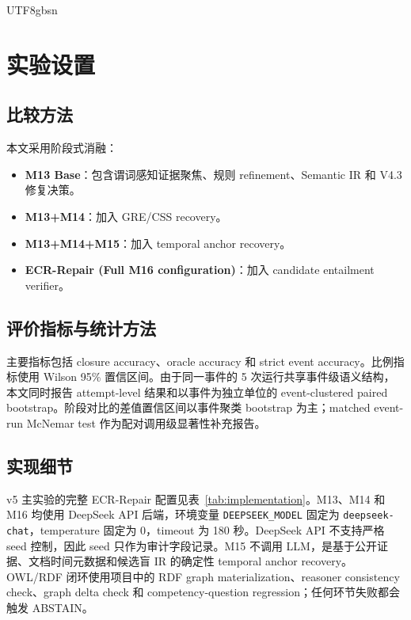 \documentclass[11pt]{article}
\begin{document}
\begin{CJK*}{UTF8}{gbsn}
\section{实验设置}

\subsection{比较方法}

本文采用阶段式消融：

\begin{itemize}
    \item \textbf{M13 Base}：包含谓词感知证据聚焦、规则 refinement、Semantic IR 和 V4.3 修复决策。
    \item \textbf{M13+M14}：加入 GRE/CSS recovery。
    \item \textbf{M13+M14+M15}：加入 temporal anchor recovery。
    \item \textbf{ECR-Repair (Full M16 configuration)}：加入 candidate entailment verifier。
\end{itemize}

\subsection{评价指标与统计方法}

主要指标包括 closure accuracy、oracle accuracy 和 strict event accuracy。比例指标使用 Wilson 95\% 置信区间。由于同一事件的 5 次运行共享事件级语义结构，本文同时报告 attempt-level 结果和以事件为独立单位的 event-clustered paired bootstrap。阶段对比的差值置信区间以事件聚类 bootstrap 为主；matched event-run McNemar test 作为配对调用级显著性补充报告。

\subsection{实现细节}

v5 主实验的完整 ECR-Repair 配置见表~\ref{tab:implementation}。M13、M14 和 M16 均使用 DeepSeek API 后端，环境变量 \texttt{DEEPSEEK\_MODEL} 固定为 \texttt{deepseek-chat}，temperature 固定为 0，timeout 为 180 秒。DeepSeek API 不支持严格 seed 控制，因此 seed 只作为审计字段记录。M15 不调用 LLM，是基于公开证据、文档时间元数据和候选盲 IR 的确定性 temporal anchor recovery。OWL/RDF 闭环使用项目中的 RDF graph materialization、reasoner consistency check、graph delta check 和 competency-question regression；任何环节失败都会触发 ABSTAIN。


\end{CJK*}
\end{document}
